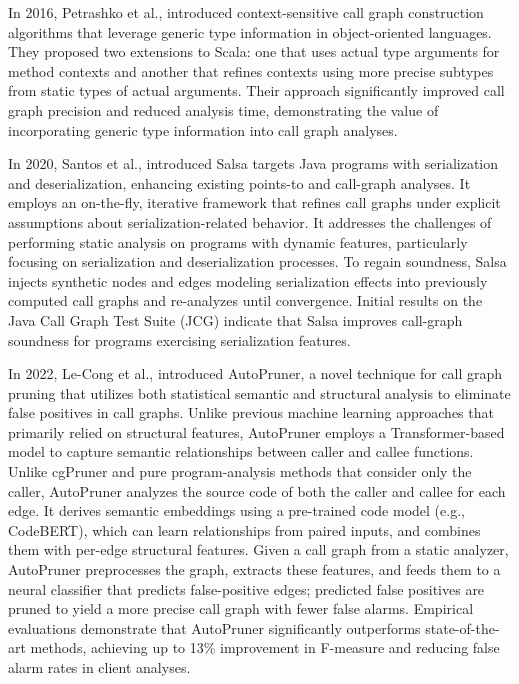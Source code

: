 
In 2016, Petrashko et al., introduced context-sensitive call graph construction algorithms that leverage generic type information in object-oriented languages. 
They proposed two extensions to Scala: one that uses actual type arguments for method contexts and another that refines contexts using more precise subtypes from static types of actual arguments. Their approach significantly improved call graph precision and reduced analysis time, demonstrating the value of incorporating generic type information into call graph analyses.

In 2020, Santos et al., introduced Salsa targets Java programs with serialization and deserialization, enhancing existing points-to and call-graph analyses. It employs an on-the-fly, iterative framework that refines call graphs under explicit assumptions about serialization-related behavior. It addresses the challenges of performing static analysis on programs with dynamic features, particularly focusing on serialization and deserialization processes. To regain soundness, Salsa injects synthetic nodes and edges modeling serialization effects into previously computed call graphs and re-analyzes until convergence. Initial results on the Java Call Graph Test Suite (JCG) indicate that Salsa improves call-graph soundness for programs exercising serialization features.

In 2022, Le-Cong et al., introduced AutoPruner, a novel technique for call graph pruning that utilizes both statistical semantic and structural analysis to eliminate false positives in call graphs. Unlike previous machine learning approaches that primarily relied on structural features, AutoPruner employs a Transformer-based model to capture semantic relationships between caller and callee functions. Unlike cgPruner and pure program-analysis methods that consider only the caller, AutoPruner analyzes the source code of both the caller and callee for each edge. It derives semantic embeddings using a pre-trained code model (e.g., CodeBERT), which can learn relationships from paired inputs, and combines them with per-edge structural features. Given a call graph from a static analyzer, AutoPruner preprocesses the graph, extracts these features, and feeds them to a neural classifier that predicts false-positive edges; predicted false positives are pruned to yield a more precise call graph with fewer false alarms.
Empirical evaluations demonstrate that AutoPruner significantly outperforms state-of-the-art methods, achieving up to 13\% improvement in F-measure and reducing false alarm rates in client analyses.

